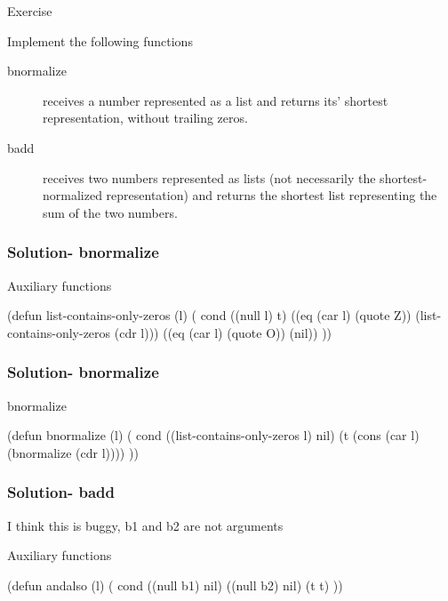 \documentclass[fleqn]{beamer}
\begin{document}
\begin{frame}{Exercise}
\begin{block}{Implement the following functions}
  \begin{description}
    \item [bnormalize] receives a number represented as a list and returns its'
      shortest representation, without trailing zeros.
    \item [badd] receives two numbers represented as lists (not necessarily the
      shortest-
      normalized representation) and returns the shortest list representing the
      sum of the two numbers.
  \end{description}
\end{block}
\end{frame}

\begin{frame}[fragile]
\frametitle{Solution- bnormalize}
\begin{block}{Auxiliary functions}
  \begin{LISP}
(defun list-contains-only-zeros (l) (
  cond
    ((null l) t)
    ((eq (car l) (quote Z))
      (list-contains-only-zeros (cdr l)))
    ((eq (car l) (quote O)) (nil))
))
    \end{LISP}
\end{block}
\end{frame}

\begin{frame}[fragile]
\frametitle{Solution- bnormalize}
\begin{block}{bnormalize}
  \begin{LISP}
(defun bnormalize (l) (
  cond
    ((list-contains-only-zeros l) nil)
    (t (cons (car l) (bnormalize (cdr l))))
))
    \end{LISP}
\end{block}
\end{frame}

\begin{frame}[fragile]
\frametitle{Solution- badd}
I think this is buggy, b1 and b2 are not arguments
\begin{block}{Auxiliary functions}
  \begin{LISP}
(defun andalso (l) (
  cond
    ((null b1) nil)
    ((null b2) nil)
    (t t)
))
    \end{LISP}
\end{block}
\end{frame}
\end{document}
